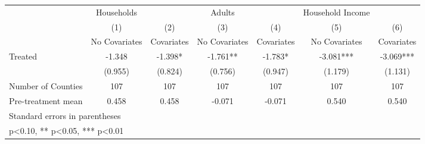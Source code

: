 {
\def\sym#1{\ifmmode^{#1}\else\(^{#1}\)\fi}
\begin{tabular}{l*{6}{c}}
\hline\hline
            &  Households   &               &      Adults   &               &Household Income   &               \\
            &\multicolumn{1}{c}{(1)}&\multicolumn{1}{c}{(2)}&\multicolumn{1}{c}{(3)}&\multicolumn{1}{c}{(4)}&\multicolumn{1}{c}{(5)}&\multicolumn{1}{c}{(6)}\\
            &\multicolumn{1}{c}{No Covariates}&\multicolumn{1}{c}{Covariates}&\multicolumn{1}{c}{No Covariates}&\multicolumn{1}{c}{Covariates}&\multicolumn{1}{c}{No Covariates}&\multicolumn{1}{c}{Covariates}\\
\hline
Treated     &      -1.348   &      -1.398*  &      -1.761** &      -1.783*  &      -3.081***&      -3.069***\\
            &     (0.955)   &     (0.824)   &     (0.756)   &     (0.947)   &     (1.179)   &     (1.131)   \\
\hline
Number of Counties&         107   &         107   &         107   &         107   &         107   &         107   \\
Pre-treatment mean&       0.458   &       0.458   &      -0.071   &      -0.071   &       0.540   &       0.540   \\
\hline\hline
\multicolumn{7}{l}{\footnotesize Standard errors in parentheses}\\
\multicolumn{7}{l}{\footnotesize * p<0.10, ** p<0.05, *** p<0.01}\\
\end{tabular}
}
